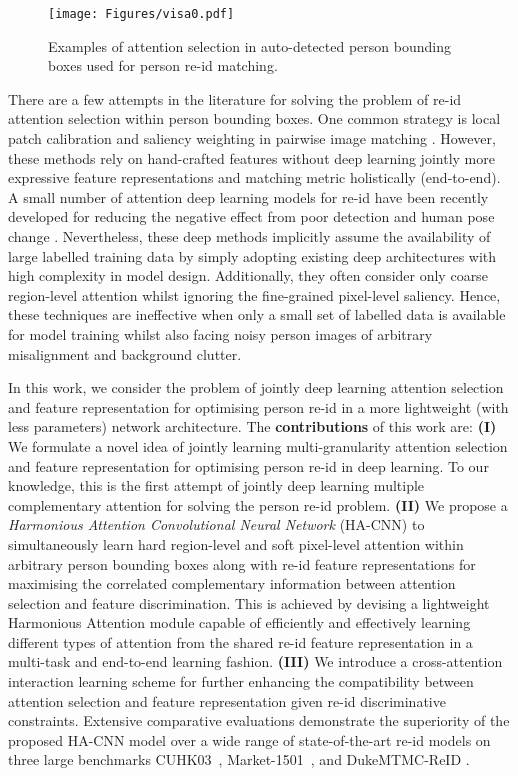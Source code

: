 \documentclass[10pt,twocolumn,letterpaper]{article}
\begin{document}
\begin{figure}[!h]
	\centering
	\texttt{[image: Figures/visa0.pdf]}
	\caption{Examples of attention selection in auto-detected person bounding
          boxes used for person re-id matching.
}
	\label{fig:reid}
	\vspace{-0.3cm}
\end{figure}

There are a few attempts in the literature for solving
the problem of re-id attention selection within person bounding boxes.
One common strategy is local patch calibration and saliency weighting
in pairwise image matching
\cite{SalienceReId_CVPR13,shen2015person,zheng2015partial,hanxiao2014GTS}.
However, these methods rely on hand-crafted features
without deep learning jointly more expressive feature representations
and matching metric holistically (end-to-end).
A small number of attention deep learning models for re-id have been recently developed
for reducing the negative effect 
from poor detection and human pose change
\cite{li2017learning,zhao2017deeply,su2017pose}.  
Nevertheless, these deep methods implicitly assume the availability of large labelled training data
by simply adopting existing deep architectures with high complexity in model design.
Additionally, they often consider only coarse region-level attention whilst
ignoring the fine-grained pixel-level saliency.
Hence, these techniques are ineffective when only a small set of labelled data is
available for model training whilst also facing noisy person images of
arbitrary misalignment and background clutter. 

In this work, we consider the problem of jointly deep learning attention selection
and feature representation for optimising person re-id in a more
lightweight (with less parameters) network architecture.
The {\bf contributions} of this work are:
{\bf (I)} 
We formulate a novel idea of jointly learning 
multi-granularity attention selection and feature representation 
for optimising person re-id
in deep learning. 
To our knowledge, this is the first attempt of jointly deep learning 
multiple complementary attention for solving the person re-id problem.
{\bf (II)} 
We propose a {\em Harmonious Attention Convolutional Neural Network} (HA-CNN)
to simultaneously learn hard region-level and soft pixel-level
attention within arbitrary person bounding boxes along with re-id feature representations 
for maximising the correlated complementary information
between attention selection and feature discrimination.  
This is achieved by devising a lightweight Harmonious Attention module
capable of efficiently and effectively learning different types of attention
from the shared re-id feature representation in a multi-task and end-to-end learning fashion.
{\bf (III)}
We introduce a cross-attention interaction learning scheme
for further enhancing the compatibility between attention 
selection and feature representation given re-id discriminative constraints.
Extensive comparative evaluations demonstrate the superiority of the
proposed HA-CNN model over a wide range of state-of-the-art
re-id models on three large benchmarks
CUHK03~\cite{li2014deepreid}, Market-1501~\cite{zheng2015scalable},
and DukeMTMC-ReID \cite{zheng2017unlabeled}.
\end{document}
